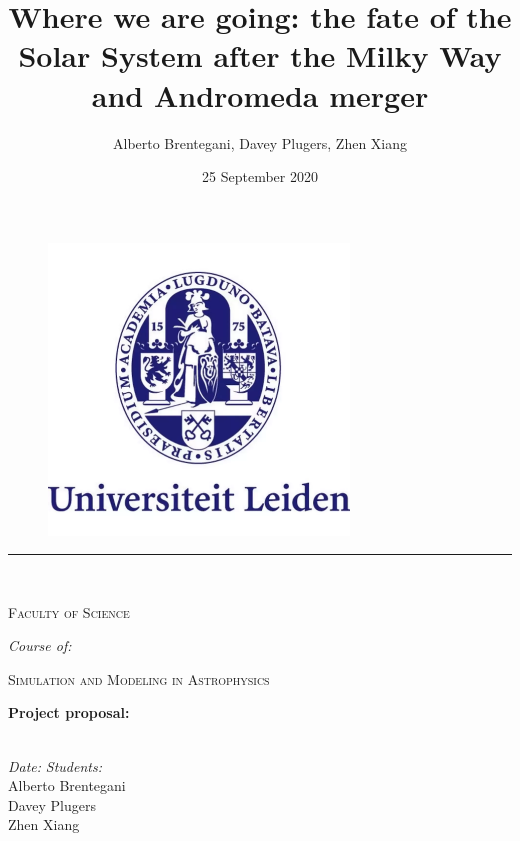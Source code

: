 \documentclass[10pt,english]{article}
\title{Where we are going: the fate of the Solar System after the Milky Way and Andromeda merger}
\author{Alberto Brentegani, Davey Plugers, Zhen Xiang}
\date{25 September 2020}
\begin{document}
\restoregeometry

\begin{titlepage}
\makeatletter
\begin{center}

\vspace*{-1in}
\begin{figure}[htb]
    \centering
    \includegraphics[width=8cm]{lu_logo.png}
\end{figure}

\vspace{-25pt}
\rule{125mm}{0.1mm} \\
\vspace{5pt}
\begin{Large}
    \textsc{Faculty of Science}\\
\end{Large}
\vspace{5pt}
\textit{Course of:}\\

\begin{Large}
    \textsc{Simulation and Modeling in Astrophysics}\\
\end{Large}
\vspace{30pt}

\begin{LARGE}
    \textbf{Project proposal:} \\
    \textbf{\@title} \\
\end{LARGE}
\vfill

\begin{normalsize}
	\begin{flushleft}
	  \textit{Date:} \hfill \textit{Students:}\\
	  \vspace{1pt}
	  \@date \hfill Alberto Brentegani\\
	  \hfill Davey Plugers\\
	  \hfill Zhen Xiang\\
	  \vspace{10pt}
	\end{flushleft}
\end{normalsize}
\vspace{20pt}


\end{center}
\end{titlepage}
\end{document}
